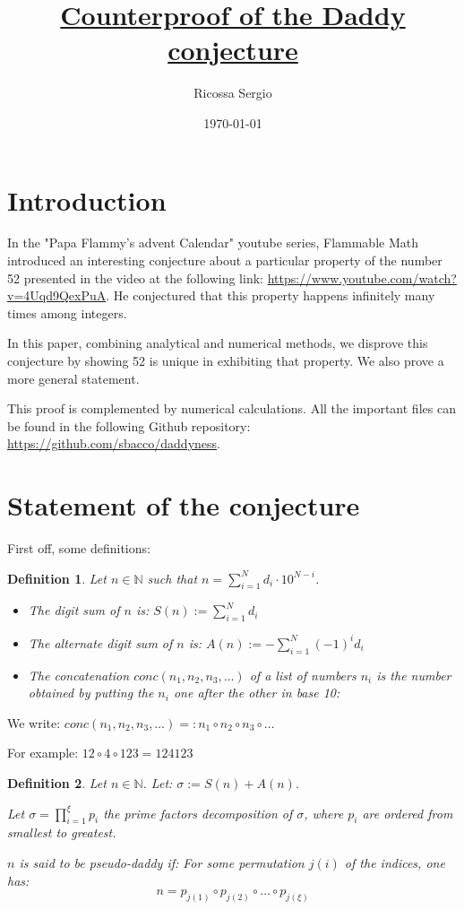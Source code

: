 \documentclass[a4paper, 11pt]{report}
\date{\Large{ \today}}
\author{\Large{Ricossa Sergio}}
\newtheorem{definition}{Definition}
\begin{document}
\title{\Huge{\underline{Counterproof of the Daddy conjecture}}}

\maketitle
\thispagestyle{fancy}
\newpage
\section{Introduction}
	In the "Papa Flammy's advent Calendar" youtube series, Flammable Math introduced an interesting conjecture about a particular property of the number 52 presented in the video at the following link: \url{https://www.youtube.com/watch?v=4Uqd9QexPuA}. He conjectured that this property happens infinitely many times among integers.
	
	In this paper, combining analytical and numerical methods, we disprove this conjecture by showing 52 is unique in exhibiting that property. We also prove a more general statement.
	
	This proof is complemented by numerical calculations. All the important files can be found in the following Github repository: \url{https://github.com/sbacco/daddyness}.

\section{Statement of the conjecture}

	First off, some definitions:
	\begin{definition}
		Let $n\in\mathbb{N}$ such that $n = \sum_{i=1}^Nd_i\cdot10^{N-i}$.
		
		\begin{itemize}
			\item The \emph{digit sum} of $n$ is: $S(n):=\sum_{i=1}^Nd_i$
			\item The \emph{alternate digit sum} of $n$ is: $A(n):=-\sum_{i=1}^N(-1)^id_i$
			\item The \emph{concatenation} $conc(n_1,n_2,n_3,\dots)$ of a list of numbers $n_i$ is the number obtained by putting the $n_i$ one after the other in base 10:
		\end{itemize}
	\end{definition}

	We write: $conc(n_1,n_2,n_3,\dots) =: n_1\circ n_2\circ n_3\circ\dots$
			
	For example: $12\circ4\circ123=124123$
	
	\begin{definition}
		Let $n\in\mathbb{N}$. Let: $\sigma:=S(n)+A(n)$. 
		
		Let $\sigma=\prod_{i=1}^\xi p_i$ the prime factors decomposition of $\sigma$, where $p_i$ are ordered from smallest to greatest.
		
		$n$ is said to be \emph{pseudo-daddy} if:
		For some permutation $j(i)$ of the indices, one has:
		$$n=p_{j(1)}\circ p_{j(2)}\circ\dots\circ p_{j(\xi)}$$
		
	\end{definition}
	
\end{document}
